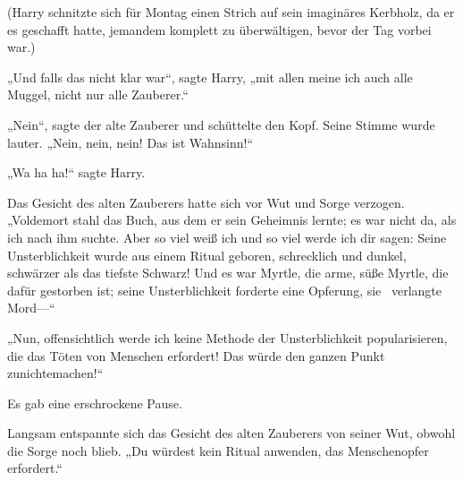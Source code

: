 (Harry schnitzte sich für Montag einen Strich auf sein imaginäres Kerbholz, da er es geschafft hatte, jemandem komplett zu überwältigen, bevor der Tag vorbei war.)

„Und falls das nicht klar war“, sagte Harry, „mit allen meine ich auch alle Muggel, nicht nur alle Zauberer.“

„Nein“, sagte der alte Zauberer und schüttelte den Kopf. Seine Stimme wurde lauter. „Nein, nein, nein! Das ist Wahnsinn!“

„Wa ha ha!“ sagte Harry.

Das Gesicht des alten Zauberers hatte sich vor Wut und Sorge verzogen. „Voldemort stahl das Buch, aus dem er sein Geheimnis lernte; es war nicht da, als ich nach ihm suchte. Aber so viel weiß ich und so viel werde ich dir sagen: Seine Unsterblichkeit wurde aus einem Ritual geboren, schrecklich und dunkel, schwärzer als das tiefste Schwarz! Und es war Myrtle, die arme, süße Myrtle, die dafür gestorben ist; seine Unsterblichkeit forderte eine Opferung, sie ~verlangte Mord—“

„Nun, offensichtlich werde ich keine Methode der Unsterblichkeit popularisieren, die das Töten von Menschen erfordert! Das würde den ganzen Punkt zunichtemachen!“

Es gab eine erschrockene Pause.

Langsam entspannte sich das Gesicht des alten Zauberers von seiner Wut, obwohl die Sorge noch blieb. „Du würdest kein Ritual anwenden, das Menschenopfer erfordert.“

